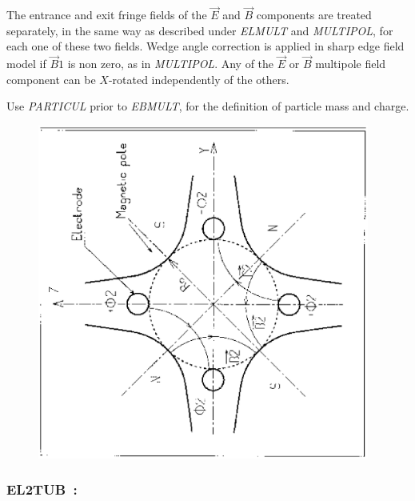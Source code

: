 {\bigskip

\noindent The entrance and exit fringe fields of the $ \vec  E $ and $ \vec  B$ components are treated 
separately, in the same way as described under \textsl{ELMULT} 
 and \textsl{MULTIPOL},
for each one of these two fields. Wedge angle correction is applied in sharp edge field model if $ \vec  B1$ is non zero, as in \textsl{MULTIPOL}. Any of the $ \vec  E $ or $ \vec  B $ multipole field
component can be $X$-rotated independently of the others. 

\bigskip

\noindent Use \textsl{PARTICUL} prior to \textsl{EBMULT}, for the 
 definition of  particle mass and charge.
\vfill

\begin{figure}[H]
\centerline{\includegraphics[height=11cm,angle=-90]{Fig20.ps}}
\end{figure}

\newpage

\subsubsection*{EL2TUB~: \ELTwoTUBTitl} \label{EL2TUB} 
\medskip

}
